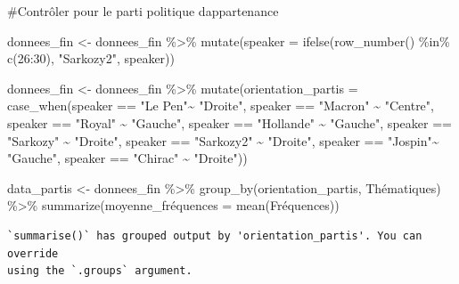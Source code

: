 \documentclass[
  letterpaper,
  DIV=11,
  numbers=noendperiod]{scrartcl}
\newenvironment{Shaded}{\begin{snugshade}}{\end{snugshade}}
\newcommand{\AttributeTok}[1]{\textcolor[rgb]{0.40,0.45,0.13}{#1}}
\newcommand{\CommentTok}[1]{\textcolor[rgb]{0.37,0.37,0.37}{#1}}
\newcommand{\DecValTok}[1]{\textcolor[rgb]{0.68,0.00,0.00}{#1}}
\newcommand{\FunctionTok}[1]{\textcolor[rgb]{0.28,0.35,0.67}{#1}}
\newcommand{\NormalTok}[1]{\textcolor[rgb]{0.00,0.23,0.31}{#1}}
\newcommand{\OtherTok}[1]{\textcolor[rgb]{0.00,0.23,0.31}{#1}}
\newcommand{\SpecialCharTok}[1]{\textcolor[rgb]{0.37,0.37,0.37}{#1}}
\newcommand{\StringTok}[1]{\textcolor[rgb]{0.13,0.47,0.30}{#1}}
\begin{document}
\begin{Shaded}
\begin{Highlighting}[]
\CommentTok{\#Contrôler pour le parti politique d\textquotesingle{}appartenance}

\NormalTok{donnees\_fin }\OtherTok{\textless{}{-}}\NormalTok{ donnees\_fin }\SpecialCharTok{\%\textgreater{}\%} \FunctionTok{mutate}\NormalTok{(}\AttributeTok{speaker =} \FunctionTok{ifelse}\NormalTok{(}\FunctionTok{row\_number}\NormalTok{() }\SpecialCharTok{\%in\%} \FunctionTok{c}\NormalTok{(}\DecValTok{26}\SpecialCharTok{:}\DecValTok{30}\NormalTok{), }\StringTok{"Sarkozy2"}\NormalTok{, speaker))}

\NormalTok{donnees\_fin }\OtherTok{\textless{}{-}}\NormalTok{ donnees\_fin }\SpecialCharTok{\%\textgreater{}\%} \FunctionTok{mutate}\NormalTok{(}\AttributeTok{orientation\_partis =} \FunctionTok{case\_when}\NormalTok{(speaker }\SpecialCharTok{==} \StringTok{"Le Pen"}\SpecialCharTok{\textasciitilde{}} \StringTok{"Droite"}\NormalTok{, speaker }\SpecialCharTok{==} \StringTok{"Macron"} \SpecialCharTok{\textasciitilde{}} \StringTok{"Centre"}\NormalTok{, speaker }\SpecialCharTok{==} \StringTok{"Royal"} \SpecialCharTok{\textasciitilde{}} \StringTok{"Gauche"}\NormalTok{, speaker }\SpecialCharTok{==} \StringTok{"Hollande"} \SpecialCharTok{\textasciitilde{}} \StringTok{"Gauche"}\NormalTok{, speaker }\SpecialCharTok{==} \StringTok{"Sarkozy"} \SpecialCharTok{\textasciitilde{}} \StringTok{"Droite"}\NormalTok{, speaker }\SpecialCharTok{==} \StringTok{"Sarkozy2"} \SpecialCharTok{\textasciitilde{}} \StringTok{"Droite"}\NormalTok{, speaker }\SpecialCharTok{==} \StringTok{"Jospin"}\SpecialCharTok{\textasciitilde{}} \StringTok{"Gauche"}\NormalTok{, speaker }\SpecialCharTok{==} \StringTok{"Chirac"} \SpecialCharTok{\textasciitilde{}} \StringTok{"Droite"}\NormalTok{))}

\NormalTok{data\_partis }\OtherTok{\textless{}{-}}\NormalTok{ donnees\_fin }\SpecialCharTok{\%\textgreater{}\%} \FunctionTok{group\_by}\NormalTok{(orientation\_partis, Thématiques) }\SpecialCharTok{\%\textgreater{}\%} \FunctionTok{summarize}\NormalTok{(moyenne\_fréquences }\OtherTok{=} \FunctionTok{mean}\NormalTok{(Fréquences))}
\end{Highlighting}
\end{Shaded}

\begin{verbatim}
`summarise()` has grouped output by 'orientation_partis'. You can override
using the `.groups` argument.
\end{verbatim}
\end{document}
